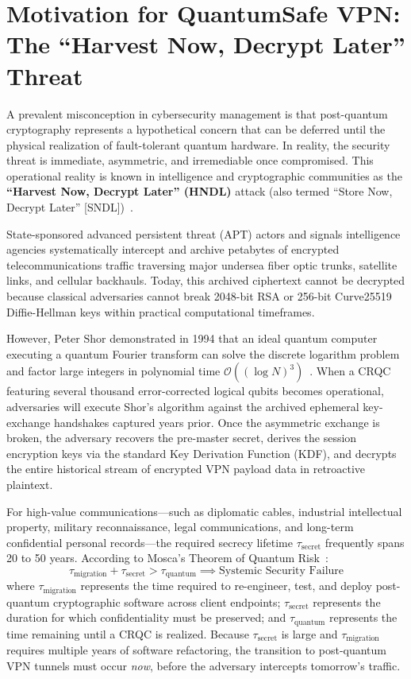 \section{Motivation for QuantumSafe VPN: The ``Harvest Now, Decrypt Later'' Threat}
\label{sec:hndl_threat}

A prevalent misconception in cybersecurity management is that post-quantum cryptography represents a hypothetical concern that can be deferred until the physical realization of fault-tolerant quantum hardware. In reality, the security threat is immediate, asymmetric, and irremediable once compromised. This operational reality is known in intelligence and cryptographic communities as the \textbf{``Harvest Now, Decrypt Later'' (HNDL)} attack (also termed ``Store Now, Decrypt Later'' [SNDL])~\cite{bernstein2017postquantum}.

State-sponsored advanced persistent threat (APT) actors and signals intelligence agencies systematically intercept and archive petabytes of encrypted telecommunications traffic traversing major undersea fiber optic trunks, satellite links, and cellular backhauls. Today, this archived ciphertext cannot be decrypted because classical adversaries cannot break 2048-bit RSA or 256-bit Curve25519 Diffie-Hellman keys within practical computational timeframes.

However, Peter Shor demonstrated in 1994 that an ideal quantum computer executing a quantum Fourier transform can solve the discrete logarithm problem and factor large integers in polynomial time $\mathcal{O}((\log N)^3)$~\cite{shor1994algorithms}. When a CRQC featuring several thousand error-corrected logical qubits becomes operational, adversaries will execute Shor's algorithm against the archived ephemeral key-exchange handshakes captured years prior. Once the asymmetric exchange is broken, the adversary recovers the pre-master secret, derives the session encryption keys via the standard Key Derivation Function (KDF), and decrypts the entire historical stream of encrypted VPN payload data in retroactive plaintext.

For high-value communications---such as diplomatic cables, industrial intellectual property, military reconnaissance, legal communications, and long-term confidential personal records---the required secrecy lifetime $\tau_{\text{secret}}$ frequently spans 20 to 50 years. According to Mosca's Theorem of Quantum Risk~\cite{stebila2020postquantum}:
\begin{equation}
\label{eq:mosca_theorem}
\tau_{\text{migration}} + \tau_{\text{secret}} > \tau_{\text{quantum}} \implies \text{Systemic Security Failure}
\end{equation}
where $\tau_{\text{migration}}$ represents the time required to re-engineer, test, and deploy post-quantum cryptographic software across client endpoints; $\tau_{\text{secret}}$ represents the duration for which confidentiality must be preserved; and $\tau_{\text{quantum}}$ represents the time remaining until a CRQC is realized. Because $\tau_{\text{secret}}$ is large and $\tau_{\text{migration}}$ requires multiple years of software refactoring, the transition to post-quantum VPN tunnels must occur \textit{now}, before the adversary intercepts tomorrow's traffic.

